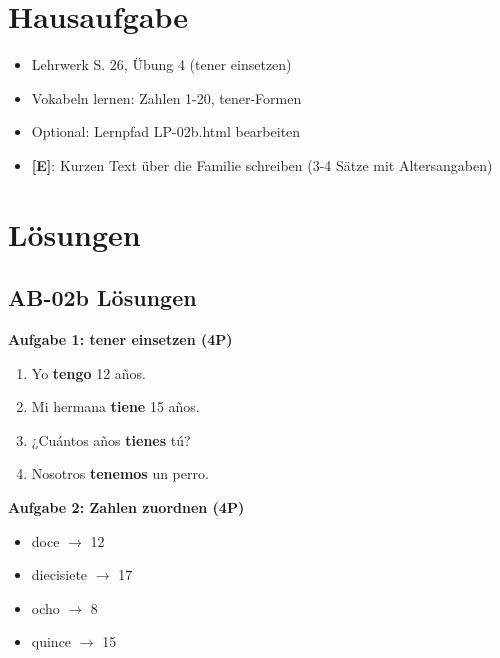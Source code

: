\documentclass[11pt,a4paper]{article}
\newcommand{\E}{\textcolor{erweiterung}{\textbf{[E]}}}
\begin{document}
\section{Hausaufgabe}

\begin{itemize}
    \item Lehrwerk S. 26, Übung 4 (tener einsetzen)
    \item Vokabeln lernen: Zahlen 1-20, tener-Formen
    \item Optional: Lernpfad LP-02b.html bearbeiten
    \item \E{}: Kurzen Text über die Familie schreiben (3-4 Sätze mit Altersangaben)
\end{itemize}

\section{Lösungen}

\subsection{AB-02b Lösungen}

\textbf{Aufgabe 1: tener einsetzen (4P)}
\begin{enumerate}[label=\alph*)]
    \item Yo \textbf{tengo} 12 años.
    \item Mi hermana \textbf{tiene} 15 años.
    \item ¿Cuántos años \textbf{tienes} tú?
    \item Nosotros \textbf{tenemos} un perro.
\end{enumerate}

\textbf{Aufgabe 2: Zahlen zuordnen (4P)}
\begin{itemize}
    \item doce $\rightarrow$ 12
    \item diecisiete $\rightarrow$ 17
    \item ocho $\rightarrow$ 8
    \item quince $\rightarrow$ 15
\end{itemize}
\end{document}
